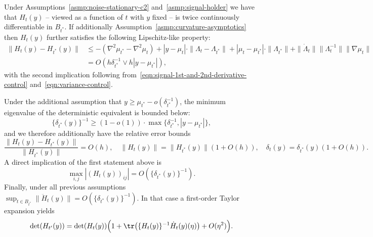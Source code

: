\documentclass{article}
\begin{document}
	Under Assumptions~\ref{asmp:noise-stationary-c2} and~\ref{asmp:signal-holder} we have that $H_t(y)$ -- viewed as a function of $t$ with $y$ fixed -- is twice continuously differentiable in $B_{t^*}$. If additionally Assumption~\ref{asmp:curvature-asymptotics} then $H_t(y)$ further satisfies the following Lipschitz-like property:
	\begin{align}
		\|H_t(y) - H_{t^*}(y)\| 
		& \leq -(\nabla^2 \mu_{t^*} - \nabla^2 \mu_{t}) + |y - \mu_t|\cdot \|\Lambda_t - \Lambda_{t^*}\| + |\mu_t - \mu_{t^*}| \cdot \|\Lambda_{t^*}\| + \|\dot{\Lambda}_t\| \|\Lambda_t^{-1}\| \|\nabla \mu_t\| \nonumber \\
		& = O(h\delta_{t^*}^{-1} \vee h|y - \mu_{t^*}|), \label{eqn:deterministic-hessian-continuity}
	\end{align} 
	with the second implication following from~\eqref{eqn:signal-1st-and-2nd-derivative-control} and~\eqref{eqn:variance-control}. 
	
	Under the additional assumption that $y \geq \mu_{t^*} - o(\delta_{t^*}^{-1})$, the minimum eigenvalue of the deterministic equivalent is bounded below:
	\begin{equation}
	\label{eqn:deterministic-hessian-min-eigenvalue}
	\{\delta_{t^*}(y)\}^{-1} \geq (1 - o(1)) \cdot \max\{\delta_{t^*}^{-1}, |y - \mu_{t^*}|\},
	\end{equation}
	and we therefore additionally have the relative error bounds
	\begin{equation}
		\label{eqn:deterministic-hessian-norm}
		\frac{\|H_t(y) - H_{t^*}(y)\|}{\|H_{t^*}(y)\|} = O(h), \quad \|H_t(y)\| = \|H_{t^*}(y)\| (1 + O(h)), \quad \delta_{t}(y) = \delta_{t^*}(y) (1 + O(h)).
	\end{equation}
	A direct implication of the first statement above is
	\begin{equation}
		\label{eqn:deterministic-hessian-pointwise}
		\max_{i,j} |(H_t(y))_{ij}| = O(\{\delta_{t^*}(y)\}^{-1}).
	\end{equation}
	Finally, under all previous assumptions $\sup_{t \in B_{t^*}} \|\ddot{H}_{t}(y)\| = O(\{\delta_{{t^*}}(y)\}^{-1})$. In that case a first-order Taylor expansion yields
	\begin{equation}
		\label{eqn:taylor-expansion-det}
		\det(H_{t'}(y)) = \det(H_{t}(y)) \Big(1 + \tr\big(\{H_{t}(y)\}^{-1} \dot{H}_{t}(y)(\eta)\big) + O(\eta^2)\Big).
	\end{equation}
\end{document}
